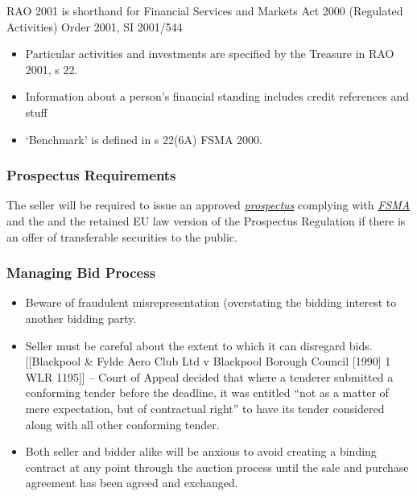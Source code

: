 \documentclass[
]{article}
\newenvironment{Shaded}{}{}
\newcommand{\NormalTok}[1]{#1}
\providecommand{\tightlist}{%
  \setlength{\itemsep}{0pt}\setlength{\parskip}{0pt}}
\begin{document}
\begin{Shaded}
\begin{Highlighting}[]
\NormalTok{RAO 2001 is shorthand for Financial Services and Markets Act 2000 (Regulated Activities) Order 2001, SI 2001/544}
\end{Highlighting}
\end{Shaded}

\begin{itemize}
\tightlist
\item
  Particular activities and investments are specified by the Treasure in
  RAO 2001, s 22.
\item
  Information about a person's financial standing includes credit
  references and stuff
\item
  `Benchmark' is defined in s 22(6A) FSMA 2000.
\end{itemize}

\hypertarget{prospectus-requirements}{%
\subsubsection{Prospectus Requirements}\label{prospectus-requirements}}

The seller will be required to issue an approved
\emph{\href{https://uk.westlaw.com/5-107-7072?originationContext=document\&transitionType=DocumentItem\&contextData=(sc.Default)\&ppcid=287b073fbf064422aba9bab6fbc11f1d}{prospectus}}
complying with
\emph{\href{https://uk.westlaw.com/5-505-5867?originationContext=document\&transitionType=PLDocumentLink\&contextData=(sc.Default)\&ppcid=287b073fbf064422aba9bab6fbc11f1d}{FSMA}}
and the and the retained EU law version of the Prospectus Regulation if
there is an offer of transferable securities to the public.

\hypertarget{managing-bid-process}{%
\subsubsection{Managing Bid Process}\label{managing-bid-process}}

\begin{itemize}
\tightlist
\item
  Beware of fraudulent misrepresentation (overstating the bidding
  interest to another bidding party.
\item
  Seller must be careful about the extent to which it can disregard
  bids. {[}{[}Blackpool \& Fylde Aero Club Ltd v Blackpool Borough
  Council {[}1990{]} 1 WLR 1195{]}{]} -- Court of Appeal decided that
  where a tenderer submitted a conforming tender before the deadline, it
  was entitled ``not as a matter of mere expectation, but of contractual
  right'' to have its tender considered along with all other conforming
  tender.
\item
  Both seller and bidder alike will be anxious to avoid creating a
  binding contract at any point through the auction process until the
  sale and purchase agreement has been agreed and exchanged.
\end{itemize}
\end{document}
